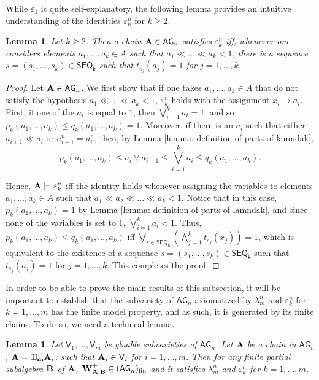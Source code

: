 \documentclass{amsart}
\newtheorem{lemma}[theorem]{Lemma}
\theoremstyle{definition}
\numberwithin{equation}{section}
\newcommand{\join}{\vee}
\newcommand{\alg}[1]{{\textbf{\upshape #1}}}  %
\newcommand{\vv}[1]{\mathsf {#1}}
\newcommand{\BG}{\vv{AG}}
\begin{document}
While $\varepsilon_1$ is quite self-explanatory, the following lemma provides an intuitive understanding of the identities $\varepsilon_k^n$ for $k \geq 2$. 
\begin{lemma}\label{lemma:epsilonk}
	Let $k \geq 2$. Then a chain $\alg A \in \BG_n$ satisfies $\varepsilon_k^n$ iff, whenever one considers elements $a_1, \ldots, a_k \in A$ such that $a_1 \ll \ldots \ll a_k < 1$, there is a sequence $s=(s_1, \dots, s_k)\in \vv{SEQ_k}$ such that $t_{s_j}(a_j)=1$ for $j=1, \dots , k$.
\end{lemma}
\begin{proof}
Let $\alg A \in \BG_n$. We first show that if one takes $a_1, \dots , a_k \in A$ that do not satisfy the hypothesis $a_1 \ll \ldots \ll a_k < 1$,  $\varepsilon_k^n$ holds with the assignment $x_i \mapsto a_i$.  
	First, if one of the $a_i$ is equal to $1$, then $\bigvee_{i=1}^ka_i=1$, and so $p_k(a_1, \dots, a_k)\leq q_k(a_1, \dots , a_k)=1.$
	Moreover, if there is an $a_i$ such that either $a_{i+1} \ll a_i$ or $a_{i+1}^n=a_i^n$, then, by Lemma \ref{lemma: definition of parts of lamndak}, $$p_k(a_1, \dots, a_k)\leq a_i \join a_{i+1}\leq \bigvee_{i=1}^k a_i \leq q_k(a_1, \dots, a_k).$$ 
	
	Hence, $\alg A \models \varepsilon_k^n$ iff the identity holds whenever assigning the variables to elements $a_1, \dots , a_k \in A$ such that $a_1 \ll a_2 \ll \dots \ll a_k < 1$. Notice that in this case, $p_k(a_1, \dots, a_k) = 1$ by Lemma \ref{lemma: definition of parts of lamndak}, and since none of the variables is set to $1$, $\bigvee_{i=1}^k a_i < 1$. Thus, $p_k(a_1, \dots, a_k) \leq q_k(a_1, \dots, a_k)$ iff $\bigvee_{s \in \vv{SEQ_k}}( \bigwedge_{j=1}^kt_{s_j}(x_j) )  = 1$, which is equivalent to the existence of a sequence $s=(s_1, \dots, s_k)\in \vv{SEQ_k}$ such that $t_{s_j}(a_j)=1$ for $j=1, \dots , k$. This completes the proof.
	\end{proof}
In order to be able to prove the main results of this subsection, it will be important to establish that the subvariety of $\BG_n$ axiomatized by $\lambda_m^n$ and $\varepsilon_k^n$ for $k=1, \dots, m$ has the finite model property, and as such, it is generated by its finite chains. To do so, we need a technical lemma.
\begin{lemma}\label{lemma: FEP K}
Let $\vv V_1, \ldots, \vv V_m$ be gluable subvarieties of $\BG_n$. Let $\alg A$ be a chain in $\BG_n$, $\alg A = \boxplus_{\bf m} \alg A_i$, such that $\alg A_i \in \vv V_i$ for $i=1 , \dots , m$. Then for any finite partial subalgebra $\alg B$ of $\alg A$, $\alg W_{\alg A, \alg B}^+ \in (\BG_n)_{\rm fin}$ and it satisfies $\lambda_m^n$ and $\varepsilon_k^n$ for $k=1, \dots, m$.
\end{lemma}
\end{document}
